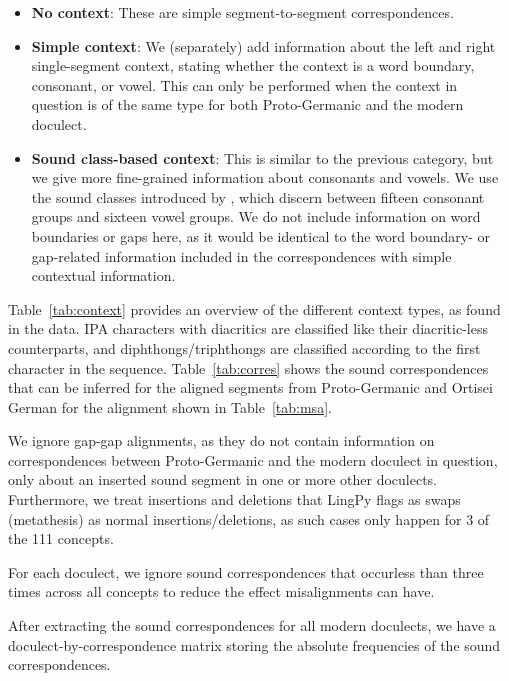 \documentclass[a4paper]{article}
\begin{document}
\begin{itemize}
\item
\textbf{No context}:
These are simple segment-to-segment correspondences.

\item
\textbf{Simple context}:
We (separately) add information about the
left and right single-segment context,
stating whether the context is a
word boundary, consonant, or vowel. 
This can only be performed when the context in question is of
the same type for both Proto-Germanic and the modern doculect.

\item
\textbf{Sound class-based context}:
This is similar to the previous category,
but we give more fine-grained information about consonants and vowels.
We use the sound classes introduced by \citet{list2012sca},
which discern between fifteen consonant groups and sixteen vowel groups.
We do not include information on word boundaries or gaps here,
as it would be identical to the word boundary- or gap-related information
included in the correspondences with simple contextual information.

\end{itemize}

Table~\ref{tab:context} provides an overview
of the different context types, as found in the data.
IPA characters with diacritics are classified
like their diacritic-less counterparts,
and diphthongs/triphthongs are classified
according to the first character in the sequence.
Table~\ref{tab:corres} shows the sound correspondences
that can be inferred for the aligned segments
from Proto-Germanic and Ortisei German for the alignment
shown in Table~\ref{tab:msa}.

We ignore gap-gap alignments,
as they do not contain information on correspondences
between Proto-Germanic and the modern doculect in question,
only about an inserted sound segment in one or more other doculects.
Furthermore, we treat insertions and deletions
that LingPy flags as swaps (metathesis) as normal insertions/deletions,
as such cases only happen for 3 of the 111 concepts.

For each doculect, we ignore sound correspondences
that occurless than three times across all concepts
to reduce the effect misalignments can have. 

After extracting the sound correspondences for
all modern doculects, we have a doculect-by-correspondence
matrix storing the absolute frequencies of the sound correspondences.
\end{document}
